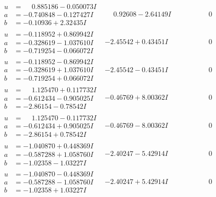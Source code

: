 \documentclass[1p]{elsarticle_modified}
\theoremstyle{definition}
\begin{document}
$$\begin{array}{c|c|c}
\begin{aligned}
u &= \phantom{-}0.885186 - 0.050073 I \\
a &= -0.740848 - 0.127427 I \\
b &= -0.10936 + 2.32435 I\end{aligned}
 & \phantom{-}0.92608 - 2.64149 I & \phantom{-0.000000 } 0 \\ \hline\begin{aligned}
u &= -0.118952 + 0.869942 I \\
a &= -0.328619 - 1.037610 I \\
b &= -0.719254 - 0.066072 I\end{aligned}
 & -2.45542 + 0.43451 I & \phantom{-0.000000 } 0 \\ \hline\begin{aligned}
u &= -0.118952 - 0.869942 I \\
a &= -0.328619 + 1.037610 I \\
b &= -0.719254 + 0.066072 I\end{aligned}
 & -2.45542 - 0.43451 I & \phantom{-0.000000 } 0 \\ \hline\begin{aligned}
u &= \phantom{-}1.125470 + 0.117732 I \\
a &= -0.612434 - 0.905025 I \\
b &= -2.86154 - 0.78542 I\end{aligned}
 & -0.46769 + 8.00362 I & \phantom{-0.000000 } 0 \\ \hline\begin{aligned}
u &= \phantom{-}1.125470 - 0.117732 I \\
a &= -0.612434 + 0.905025 I \\
b &= -2.86154 + 0.78542 I\end{aligned}
 & -0.46769 - 8.00362 I & \phantom{-0.000000 } 0 \\ \hline\begin{aligned}
u &= -1.040870 + 0.448369 I \\
a &= -0.587288 + 1.058760 I \\
b &= -1.02358 - 1.03227 I\end{aligned}
 & -2.40247 - 5.42914 I & \phantom{-0.000000 } 0 \\ \hline\begin{aligned}
u &= -1.040870 - 0.448369 I \\
a &= -0.587288 - 1.058760 I \\
b &= -1.02358 + 1.03227 I\end{aligned}
 & -2.40247 + 5.42914 I & \phantom{-0.000000 } 0\\

\end{array}$$
\end{document}
